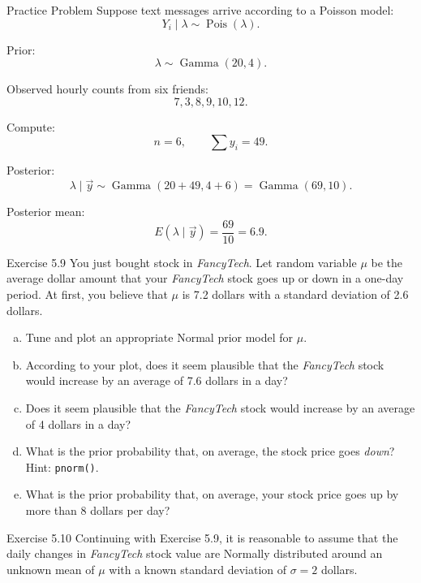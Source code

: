 \documentclass[aspectratio=43,11pt]{beamer}
\newcommand{\Pois}{\operatorname{Pois}}
\newcommand{\GammaDist}{\operatorname{Gamma}}
\begin{document}
{
\begin{frame}{Practice Problem}
Suppose text messages arrive according to a Poisson model:
\[
  Y_i\mid\lambda\sim\Pois(\lambda).
\]

Prior:
\[
  \lambda\sim\GammaDist(20,4).
\]

Observed hourly counts from six friends:
\[
  7,3,8,9,10,12.
\]

\medskip
Compute:
\[
  n=6,
  \qquad
  \sum y_i=49.
\]

Posterior:
\[
  \lambda\mid\vec y\sim\GammaDist(20+49,4+6)=\GammaDist(69,10).
\]

Posterior mean:
\[
  E(\lambda\mid\vec y)=\frac{69}{10}=6.9.
\]
\end{frame}

\begin{frame}[plain]{Exercise 5.9}
\small
You just bought stock in \textit{FancyTech}.
Let random variable $\mu$ be the average dollar amount that your \textit{FancyTech} stock goes up or down in a one-day period.
At first, you believe that $\mu$ is 7.2 dollars with a standard deviation of 2.6 dollars.

\medskip
\begin{enumerate}[a.]
    \item Tune and plot an appropriate Normal prior model for $\mu$.
    \item According to your plot, does it seem plausible that the \textit{FancyTech} stock would increase by an average of 7.6 dollars in a day?
    \item Does it seem plausible that the \textit{FancyTech} stock would increase by an average of 4 dollars in a day?
    \item What is the prior probability that, on average, the stock price goes \textit{down}? Hint: \texttt{pnorm()}.
    \item What is the prior probability that, on average, your stock price goes up by more than 8 dollars per day?
\end{enumerate}
\end{frame}

\begin{frame}[plain]{Exercise 5.10}
\small
Continuing with Exercise 5.9, it is reasonable to assume that the daily changes in \textit{FancyTech} stock value are Normally distributed around an unknown mean of $\mu$ with a known standard deviation of $\sigma = 2$ dollars.


\end{frame}}
\end{document}
